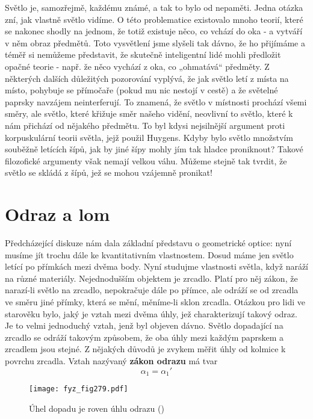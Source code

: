{    Světlo je, samozřejmě, každému známé, a tak to bylo od nepaměti. Jedna otázka zní, jak vlastně 
    světlo vidíme. O této problematice existovalo mnoho teorií, které se nakonec shodly na jednom, 
    že totiž existuje něco, co vchází do oka - a vytváří v něm obraz předmětů. Toto vysvětlení jsme 
    slyšeli tak dávno, že ho přijímáme a téměř si nemůžeme představit, že skutečně inteligentní 
    lidé mohli předložit opačné teorie - např. že něco vychází z oka, co „ohmatává“ předměty. Z 
    některých dalších důležitých pozorování vyplývá, že jak světlo letí z místa na místo, pohybuje 
    se přímočaře (pokud mu nic nestojí v cestě) a že světelné paprsky navzájem neinterferují. To 
    znamená, že světlo v místnosti prochází všemi směry, ale světlo, které křižuje směr našeho 
    vidění, neovlivní to světlo, které k nám přichází od nějakého předmětu. To byl kdysi 
    nejsilnější argument proti korpuskulární teorii světla, jejž použil Huygens. Kdyby bylo světlo 
    množstvím souběžně letících šípů, jak by jiné šípy mohly jím tak hladce proniknout? Takové 
    filozofické argumenty však nemají velkou váhu. Můžeme stejně tak tvrdit, že světlo se skládá z 
    šípů, jež se mohou vzájemně pronikat!
    
  \section{Odraz a lom}\label{fyz:IchapXXVIsecII}
    Předcházející diskuze nám dala základní představu o geometrické optice: nyní musíme jít trochu 
    dále ke kvantitativním vlastnostem. Dosud máme jen světlo letící po přímkách mezi dvěma body. 
    Nyní studujme vlastnosti světla, když naráží na různé materiály. Nejednodušším objektem je 
    zrcadlo. Platí pro něj zákon, že narazí-li světlo na zrcadlo, nepokračuje dále po přímce, ale 
    odráží se od zrcadla ve směru jiné přímky, která se mění, měníme-li sklon zrcadla. Otázkou pro 
    lidi ve starověku bylo, jaký je vztah mezi dvěma úhly, jež charakterizují takový odraz. Je to 
    velmi jednoduchý vztah, jenž byl objeven dávno. Světlo dopadající na zrcadlo se odráží takovým 
    způsobem, že oba úhly mezi každým paprskem a zrcadlem jsou stejné. Z nějakých důvodů je zvykem 
    měřit úhly od kolmice k povrchu zrcadla. Vztah nazývaný \textbf{zákon odrazu} má tvar
    \begin{equation}\label{fyz:eq336}
      \alpha_1 = \alpha_1'
    \end{equation}
    
    \begin{figure}[ht!] %
      \centering
      \texttt{[image: fyz\_fig279.pdf]}
      \caption{Úhel dopadu je roven úhlu odrazu
               (\cite[s.~346]{Feynman01})}
      \label{fyz:fig279}
    \end{figure}

}
